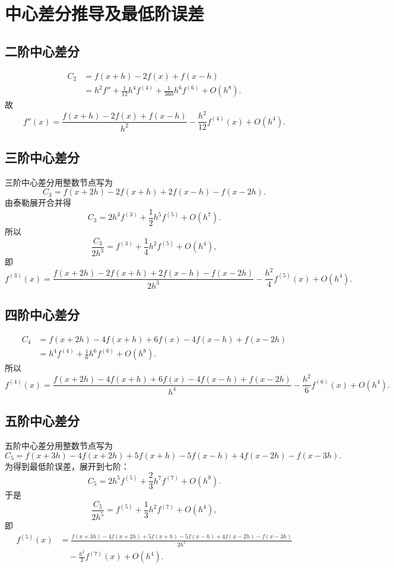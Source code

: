 \documentclass[12pt,a4paper]{ctexart}
\begin{document}
\section{中心差分推导及最低阶误差}
\subsection{二阶中心差分}
\[
\begin{aligned}
C_2&=f(x+h)-2f(x)+f(x-h)\\
&=h^2f''+\frac1{12}h^4f^{(4)}+\frac1{360}h^6f^{(6)}+O(h^8).
\end{aligned}
\]
故
\[
  \boxed{f''(x)=\frac{f(x+h)-2f(x)+f(x-h)}{h^2}-\frac{h^2}{12}f^{(4)}(x)+O(h^4).}
\]

\subsection{三阶中心差分}
三阶中心差分用整数节点写为
\[
  C_3=f(x+2h)-2f(x+h)+2f(x-h)-f(x-2h).
\]
由泰勒展开合并得
\[
  C_3=2h^3f^{(3)}+\frac12h^5f^{(5)}+O(h^7).
\]
所以
\[
  \frac{C_3}{2h^3}=f^{(3)}+\frac14h^2f^{(5)}+O(h^4),
\]
即
\[
  \boxed{f^{(3)}(x)=\frac{f(x+2h)-2f(x+h)+2f(x-h)-f(x-2h)}{2h^3}-\frac{h^2}{4}f^{(5)}(x)+O(h^4).}
\]

\subsection{四阶中心差分}
\[
\begin{aligned}
C_4&=f(x+2h)-4f(x+h)+6f(x)-4f(x-h)+f(x-2h)\\
&=h^4f^{(4)}+\frac16h^6f^{(6)}+O(h^8).
\end{aligned}
\]
所以
\[
  \boxed{f^{(4)}(x)=\frac{f(x+2h)-4f(x+h)+6f(x)-4f(x-h)+f(x-2h)}{h^4}-\frac{h^2}{6}f^{(6)}(x)+O(h^4).}
\]

\subsection{五阶中心差分}
五阶中心差分用整数节点写为
\[
  C_5=f(x+3h)-4f(x+2h)+5f(x+h)-5f(x-h)+4f(x-2h)-f(x-3h).
\]
为得到最低阶误差，展开到七阶：
\[
  C_5=2h^5f^{(5)}+\frac23h^7f^{(7)}+O(h^9).
\]
于是
\[
  \frac{C_5}{2h^5}=f^{(5)}+\frac13h^2f^{(7)}+O(h^4),
\]
即
\[
\boxed{\begin{aligned}
f^{(5)}(x)&=\frac{f(x+3h)-4f(x+2h)+5f(x+h)-5f(x-h)+4f(x-2h)-f(x-3h)}{2h^5}\\
&\quad -\frac{h^2}{3}f^{(7)}(x)+O(h^4).
\end{aligned}}
\]
\end{document}
